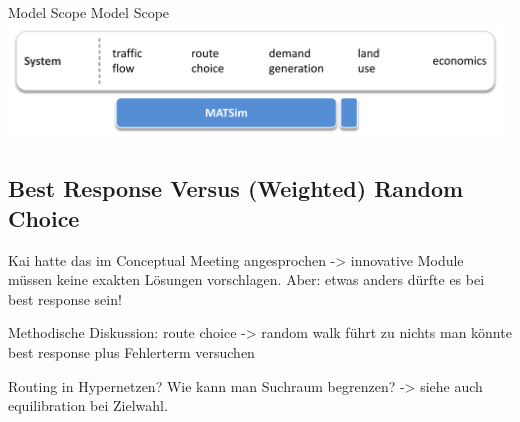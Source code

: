 \createfigure%
{Model Scope}%
{Model Scope}%
{\label{fig:scope}}%
{\includegraphics[width=0.99\textwidth, angle=0]{understanding/figures/scope.pdf}}%
{}
%


\subsection{Best Response Versus (Weighted) Random Choice}
\label{sec:bestResponseOrRandom}
Kai hatte das im Conceptual Meeting angesprochen -> innovative Module müssen keine exakten Lösungen vorschlagen. 
Aber: etwas anders dürfte es bei best response sein!


Methodische Diskussion:
route choice -> random walk führt zu nichts
man könnte best response plus Fehlerterm versuchen

Routing in Hypernetzen?
Wie kann man Suchraum begrenzen? -> siehe auch equilibration bei Zielwahl.



